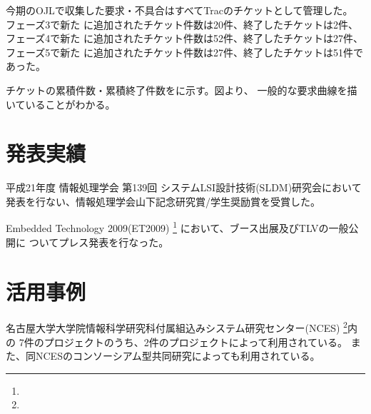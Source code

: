 今期のOJLで収集した要求・不具合はすべてTracのチケットとして管理した。
フェーズ3で新た
に追加されたチケット件数は20件、終了したチケットは2件、フェーズ4で新た
に追加されたチケット件数は52件、終了したチケットは27件、フェーズ5で新た
に追加されたチケット件数は27件、終了したチケットは51件であった。

チケットの累積件数・累積終了件数をに示す。図より、
一般的な要求曲線を描いていることがわかる。



\section{発表実績}
平成21年度 情報処理学会 第139回 システムLSI設計技術(SLDM)研究会において
発表\cite{ipsj}を行ない、情報処理学会山下記念研究賞/学生奨励賞を受賞した。

Embedded Technology 2009(ET2009)
\footnote{}
において、ブース出展及びTLVの一般公開に
ついてプレス発表を行なった。

\section{活用事例}
名古屋大学大学院情報科学研究科付属組込みシステム研究センター(NCES)
\footnote{}内の
7件のプロジェクトのうち、2件のプロジェクトによって利用されている。
また、同NCESのコンソーシアム型共同研究によっても利用されている。
